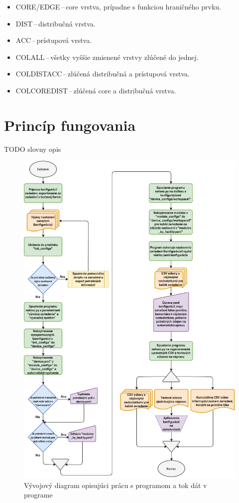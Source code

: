 \begin{itemize}
	\item CORE/EDGE\,--\,core vrstva, prípadne s funkciou hraničného prvku.
	\item DIST\,--\,distribučná vrstva.
	\item ACC\,--\,prístupová vrstva.
	\item COLALL\,--\,všetky vyššie zmienené vrstvy zlúčené do jednej.
	\item COLDISTACC\,--\,zlúčená distribučná a prístupová vrstva.
	\item COLCOREDIST\,--\,zlúčená core a distribučná vrstva.
\end{itemize}

\section{Princíp fungovania}

TODO slovny opis


\begin{figure}[H]
	\begin{center}
		\vspace*{-1cm}\includegraphics[scale=0.8]{obrazky/flowchart.pdf}
	\end{center}
	\caption[Vývojový diagram opisujúci prácu s programom a tok dát v programe]{Vývojový diagram opisujúci prácu s programom a tok dát v programe}
	\label{workflow}
\end{figure}

